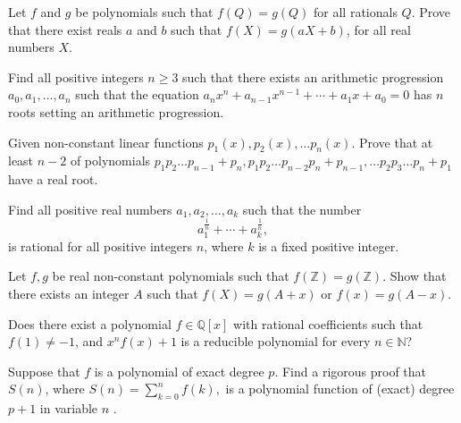 \documentclass[12pt,a4paper]{memoir}
\theoremstyle{definition}
\begin{document}
\begin{question}
	Let $f$ and $g$ be polynomials such that $f(Q)=g(Q)$ for all rationals $Q$. Prove that there exist reals $a$ and $b$ such that $f(X)=g(aX+b)$, for all real numbers $X$.
\end{question}



\begin{question}
	Find all positive integers $ n\geq 3 $ such that there exists an arithmetic progression $ a_0 , a_1, \ldots, a_n $ such that the equation $ a_nx^n + a_{n-1}x^{n-1} + \cdots+ a_1x+a_0 = 0 $ has $n$ roots setting an arithmetic progression.
\end{question}



\begin{question}
	Given non-constant linear functions $p_1(x), p_2(x), \dots p_n(x)$. Prove that at least $n-2$ of polynomials $p_1p_2\dots p_{n-1}+p_n,  p_1p_2\dots p_{n-2} p_n + p_{n-1},\dots p_2p_3\dots p_n+p_1$ have a real root.
\end{question}



\begin{question}
	Find all positive real numbers $a_1,a_2,\ldots,a_k$ such that the number \[ a_1^{\frac{1}{n}}+\cdots+a_k^{\frac{1}{n}},\] is rational for all positive integers $n$, where $k$ is a fixed positive integer.
\end{question}



\begin{question}
	Let $f,g$ be real non-constant polynomials such that $ f(\mathbb Z)=g(\mathbb Z) $. Show that there exists an integer $A$ such that $ f(X)=g(A+x) $ or $ f(x)=g(A-x) $. 
\end{question}


\begin{question}
	Does there exist a polynomial $f \in \mathbb{Q}[x]$ with rational coefficients such that $f(1) \neq -1$, and $x^nf(x) + 1$ is a reducible polynomial for every $n \in \mathbb{N}$?
\end{question}



\begin{question}
	Suppose that  $ f $ is a polynomial of exact degree  $ p.$ Find a rigorous proof that $ S(n) $,  where  $ S(n)= \sum\limits_{k=0}^{n}f(k) , $  is a polynomial function  of (exact) degree  $ p+1 $ in variable $n $ .
\end{question}
\end{document}
